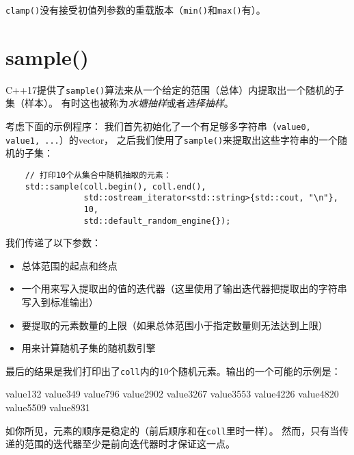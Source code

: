 \texttt{clamp()}没有接受初值列参数的重载版本（\texttt{min()}和\texttt{max()}有）。


\section{sample()}\label{ch25.4}
C++17提供了\texttt{sample()}算法来从一个给定的范围（总体）内提取出一个随机的子集（样本）。
有时这也被称为\emph{水塘抽样}或者\emph{选择抽样}。

考虑下面的示例程序：
我们首先初始化了一个有足够多字符串（\texttt{value0, value1, ...}）的vector，
之后我们使用了\texttt{sample()}来提取出这些字符串的一个随机的子集：
\begin{lstlisting}
    // 打印10个从集合中随机抽取的元素：
    std::sample(coll.begin(), coll.end(),
                std::ostream_iterator<std::string>{std::cout, "\n"},
                10,
                std::default_random_engine{});
\end{lstlisting}
我们传递了以下参数：
\begin{itemize}
    \item 总体范围的起点和终点
    \item 一个用来写入提取出的值的迭代器（这里使用了输出迭代器把提取出的字符串写入到标准输出）
    \item 要提取的元素数量的上限（如果总体范围小于指定数量则无法达到上限）
    \item 用来计算随机子集的随机数引擎
\end{itemize}
最后的结果是我们打印出了\texttt{coll}内的10个随机元素。输出的一个可能的示例是：
\begin{blacklisting}
    value132
    value349
    value796
    value2902
    value3267
    value3553
    value4226
    value4820
    value5509
    value8931
\end{blacklisting}
如你所见，元素的顺序是稳定的（前后顺序和在\texttt{coll}里时一样）。
然而，只有当传递的范围的迭代器至少是前向迭代器时才保证这一点。

